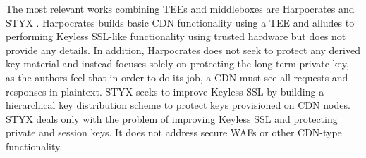 The most relevant works combining TEEs and middleboxes are Harpocrates \cite{ahmed2018harpocrates} and STYX \cite{wei2017styx}.
Harpocrates builds basic CDN functionality using a TEE and alludes to performing Keyless SSL-like functionality using trusted hardware but does not provide any details.  In addition, Harpocrates does not seek to protect any derived key material and instead focuses solely on protecting the long term private key, as the authors feel that in order to do its job, a CDN must see all requests and responses in plaintext.
STYX seeks to improve Keyless SSL by building a hierarchical key distribution scheme to protect keys provisioned on CDN nodes.  STYX deals only with the problem of improving Keyless SSL and protecting private and session keys.  It does not address secure WAFs or other CDN-type functionality.





